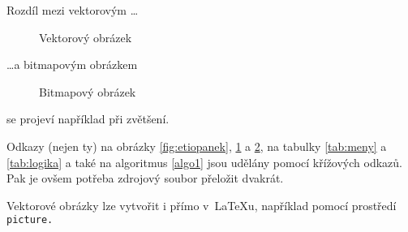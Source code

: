 \documentclass[a4paper, 11pt]{article}
\begin{document}
Rozdíl mezi vektorovým \dots

\begin{figure}[h]
\begin{center}
\caption{Vektorový obrázek}\label{fig:oniisan1}
\end{center}
\end{figure}
\noindent\dots a bitmapovým obrázkem

\begin{figure}[h]
\begin{center}
\caption{Bitmapový obrázek}\label{fig:oniisan2}
\end{center}
\end{figure}
\noindent se projeví například při zvětšení.

Odkazy (nejen ty) na obrázky \ref*{fig:etiopanek}, \ref*{fig:oniisan1} a \ref*{fig:oniisan2}, na tabulky \ref*{tab:meny} a \ref*{tab:logika} a také na algoritmus \ref*{algo1} jsou udělány pomocí křížových
odkazů. Pak je ovšem potřeba zdrojový soubor přeložit dvakrát.

Vektorové obrázky lze vytvořit i přímo v~\LaTeX u, například pomocí prostředí\texttt{ picture.}
\end{document}
